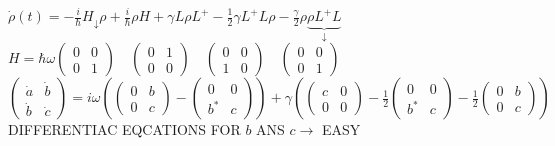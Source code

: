\documentclass[10pt]{article}
\begin{document}
$\dot{\rho}(t)=-\frac{i}{\hbar} H_{\downarrow} \rho+\frac{i}{\hbar} \rho H+\gamma L \rho L^{+}-\frac{1}{2} \gamma L^{+} L \rho-\frac{\gamma}{2} \rho \underbrace{\rho L^{+} L}_{\downarrow}$\\
$H=\hbar \omega\left(\begin{array}{ll}0 & 0 \\ 0 & 1\end{array}\right) \quad\left(\begin{array}{ll}0 & 1 \\ 0 & 0\end{array}\right) \quad\left(\begin{array}{ll}0 & 0 \\ 1 & 0\end{array}\right) \quad\left(\begin{array}{ll}0 & 0 \\ 0 & 1\end{array}\right)$\\
$\left(\begin{array}{cc}\dot{a} & \dot{b} \\ \dot{b} & \dot{c}\end{array}\right)=i \omega\left(\left(\begin{array}{ll}0 & b \\ 0 & c\end{array}\right)-\left(\begin{array}{cc}0 & 0 \\ b^{*} & c\end{array}\right)\right)+\gamma\left(\left(\begin{array}{ll}c & 0 \\ 0 & 0\end{array}\right)-\frac{1}{2}\left(\begin{array}{ll}0 & 0 \\ b^{*} & c\end{array}\right)-\frac{1}{2}\left(\begin{array}{ll}0 & b \\ 0 & c\end{array}\right)\right)$\\
DIFFERENTIAC EQCATIONS FOR $b$ ANS $c \rightarrow$ EASY
\end{document}

